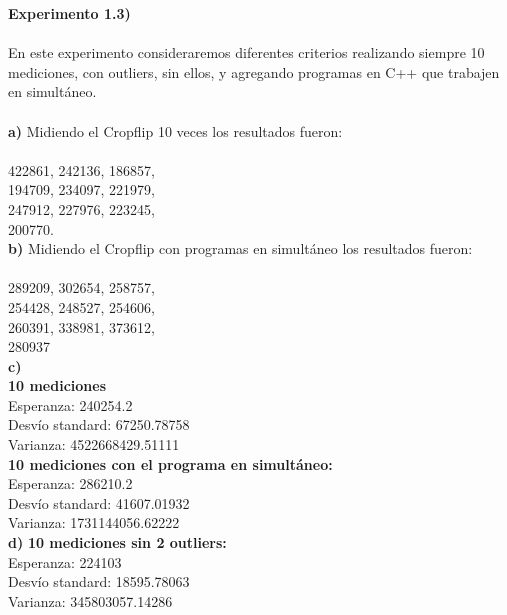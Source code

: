 \documentclass[a4paper]{article}
\begin{document}


\newpage

\textbf{Experimento 1.3)}\\ \\ 
En este experimento consideraremos diferentes criterios realizando siempre 10 mediciones, con outliers, sin ellos, y agregando programas en C++ que trabajen en simult\'{a}neo.\\ \\

\noindent \textbf{a)}
Midiendo el Cropflip 10 veces los resultados fueron:\\ \\ 422861, 242136, 186857,\\ 194709, 234097, 221979,\\ 247912, 227976, 223245,\\ 200770.\\ 

\noindent\textbf{b)} Midiendo el Cropflip con programas en simultáneo los resultados fueron:\\ \\ 289209, 302654, 258757,\\ 254428, 248527, 254606,\\ 260391, 338981, 373612,\\ 280937 \\

\noindent \textbf{c)} \\ \textbf{10 mediciones}\\Esperanza: 240254.2 \\ Desv\'{i}o standard: 67250.78758 \\ Varianza: 4522668429.51111\\ 
\noindent \textbf{10 mediciones con el programa en simult\'{a}neo:}\\Esperanza: 286210.2 \\ Desv\'{i}o standard: 41607.01932 \\
Varianza: 1731144056.62222\\ 
\textbf{d)} \textbf{10 mediciones sin 2 outliers:}\\Esperanza: 224103 \\ Desv\'{i}o standard: 18595.78063 \\ Varianza: 345803057.14286\\ 
\end{document}
